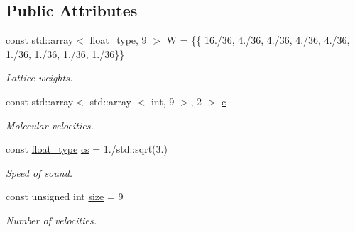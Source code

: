 \subsection*{\-Public \-Attributes}
\begin{DoxyCompactItemize}
\item 
\hypertarget{structlb_1_1v9_a26ca4b8909c0a302433d41786b31014c}{const std\-::array$<$ \hyperlink{namespacelb_a2b37d1585aef2d3da421ad0aedc6b11b}{float\-\_\-type}, 9 $>$ \hyperlink{structlb_1_1v9_a26ca4b8909c0a302433d41786b31014c}{\-W} = \{\{ 16./36, 4./36, 4./36, 4./36, 4./36, 1./36, 1./36, 1./36, 1./36\}\}}\label{structlb_1_1v9_a26ca4b8909c0a302433d41786b31014c}

\begin{DoxyCompactList}\small\item\em \-Lattice weights. \end{DoxyCompactList}\item 
\hypertarget{structlb_1_1v9_acbc98101e1585c592a91a7cce187baad}{const std\-::array$<$ std\-::array\*
$<$ int, 9 $>$, 2 $>$ \hyperlink{structlb_1_1v9_acbc98101e1585c592a91a7cce187baad}{c}}\label{structlb_1_1v9_acbc98101e1585c592a91a7cce187baad}

\begin{DoxyCompactList}\small\item\em \-Molecular velocities. \end{DoxyCompactList}\item 
\hypertarget{structlb_1_1v9_a521ae53eef5cbdbcdf3764e3a9f0fee8}{const \hyperlink{namespacelb_a2b37d1585aef2d3da421ad0aedc6b11b}{float\-\_\-type} \hyperlink{structlb_1_1v9_a521ae53eef5cbdbcdf3764e3a9f0fee8}{cs} = 1./std\-::sqrt(3.)}\label{structlb_1_1v9_a521ae53eef5cbdbcdf3764e3a9f0fee8}

\begin{DoxyCompactList}\small\item\em \-Speed of sound. \end{DoxyCompactList}\item 
\hypertarget{structlb_1_1v9_a8d722e88d7180dd4868a126bf78e8155}{const unsigned int \hyperlink{structlb_1_1v9_a8d722e88d7180dd4868a126bf78e8155}{size} = 9}\label{structlb_1_1v9_a8d722e88d7180dd4868a126bf78e8155}

\begin{DoxyCompactList}\small\item\em \-Number of velocities. \end{DoxyCompactList}\end{DoxyCompactItemize}
